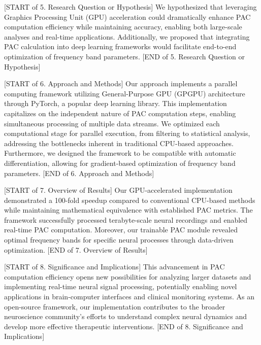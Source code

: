 [START of 5. Research Question or Hypothesis] We hypothesized that leveraging Graphics Processing Unit (GPU) acceleration could dramatically enhance PAC computation efficiency while maintaining accuracy, enabling both large-scale analyses and real-time applications. Additionally, we proposed that integrating PAC calculation into deep learning frameworks would facilitate end-to-end optimization of frequency band parameters. [END of 5. Research Question or Hypothesis]

[START of 6. Approach and Methods] Our approach implements a parallel computing framework utilizing General-Purpose GPU (GPGPU) architecture through PyTorch, a popular deep learning library. This implementation capitalizes on the independent nature of PAC computation steps, enabling simultaneous processing of multiple data streams. We optimized each computational stage for parallel execution, from filtering to statistical analysis, addressing the bottlenecks inherent in traditional CPU-based approaches. Furthermore, we designed the framework to be compatible with automatic differentiation, allowing for gradient-based optimization of frequency band parameters. [END of 6. Approach and Methods]

[START of 7. Overview of Results] Our GPU-accelerated implementation demonstrated a 100-fold speedup compared to conventional CPU-based methods while maintaining mathematical equivalence with established PAC metrics. The framework successfully processed terabyte-scale neural recordings and enabled real-time PAC computation. Moreover, our trainable PAC module revealed optimal frequency bands for specific neural processes through data-driven optimization. [END of 7. Overview of Results]

[START of 8. Significance and Implications] This advancement in PAC computation efficiency opens new possibilities for analyzing larger datasets and implementing real-time neural signal processing, potentially enabling novel applications in brain-computer interfaces and clinical monitoring systems. As an open-source framework, our implementation contributes to the broader neuroscience community's efforts to understand complex neural dynamics and develop more effective therapeutic interventions. [END of 8. Significance and Implications]

\label{sec:introduction}
